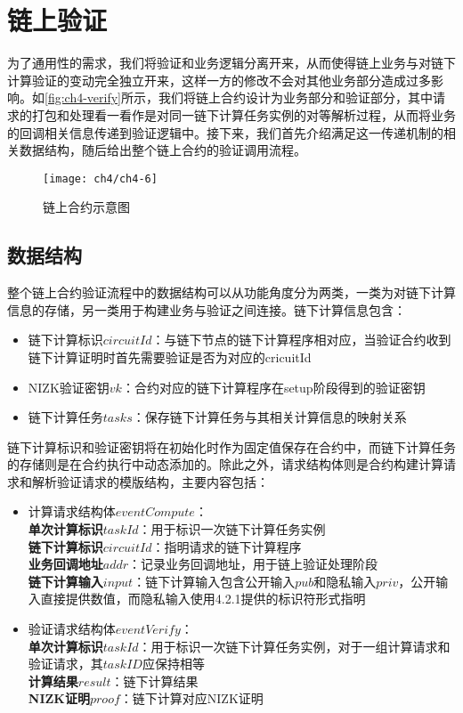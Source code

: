 \section{链上验证}
为了通用性的需求，我们将验证和业务逻辑分离开来，从而使得链上业务与对链下计算验证的变动完全独立开来，这样一方的修改不会对其他业务部分造成过多影响。如\autoref{fig:ch4-verify}所示，我们将链上合约设计为业务部分和验证部分，其中请求的打包和处理看一看作是对同一链下计算任务实例的对等解析过程，从而将业务的回调相关信息传递到验证逻辑中。接下来，我们首先介绍满足这一传递机制的相关数据结构，随后给出整个链上合约的验证调用流程。
\begin{figure}[htbp]
    \centering
    \texttt{[image: ch4/ch4-6]}
    \caption{\label{fig:ch4-verify}链上合约示意图}
\end{figure}

\subsection{数据结构} 整个链上合约验证流程中的数据结构可以从功能角度分为两类，一类为对链下计算信息的存储，另一类用于构建业务与验证之间连接。链下计算信息包含：
\begin{itemize}
    \setlength{\itemsep}{0pt}
    \setlength{\parsep}{0pt}
    \setlength{\parskip}{0pt}
    \item 链下计算标识$circuitId$：与链下节点的链下计算程序相对应，当验证合约收到链下计算证明时首先需要验证是否为对应的cricuitId
    \item NIZK验证密钥$vk$：合约对应的链下计算程序在setup阶段得到的验证密钥
    \item 链下计算任务$tasks$：保存链下计算任务与其相关计算信息的映射关系
\end{itemize}
链下计算标识和验证密钥将在初始化时作为固定值保存在合约中，而链下计算任务的存储则是在合约执行中动态添加的。除此之外，请求结构体则是合约构建计算请求和解析验证请求的模版结构，主要内容包括：
\begin{itemize}
    \setlength{\itemsep}{0pt}
    \setlength{\parsep}{0pt}
    \setlength{\parskip}{0pt}
    \item 计算请求结构体$eventCompute$：
    \\ \textbf{单次计算标识$taskId$}：用于标识一次链下计算任务实例
	\\\textbf{链下计算标识$circuitId$}：指明请求的链下计算程序
	\\\textbf{业务回调地址$addr$}：记录业务回调地址，用于链上验证处理阶段
	\\\textbf{链下计算输入$input$}：链下计算输入包含公开输入$pub$和隐私输入$priv$，公开输入直接提供数值，而隐私输入使用4.2.1提供的标识符形式指明
    \item 验证请求结构体$eventVerify$：
    \\\textbf{单次计算标识$taskId$}：用于标识一次链下计算任务实例，对于一组计算请求和验证请求，其$taskID$应保持相等
    \\\textbf{计算结果$result$}：链下计算结果
    \\\textbf{NIZK证明$proof$}：链下计算对应NIZK证明
\end{itemize}

